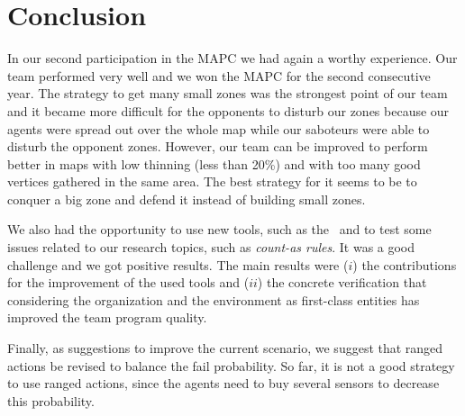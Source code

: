 \section{Conclusion}

In our second participation in the MAPC we had again a worthy experience. Our team performed very well and we won the MAPC for the second consecutive year. The strategy to get many small zones was the strongest point of our team and it became more difficult for the opponents to disturb our zones because our agents were spread out over the whole map while our saboteurs were able to disturb the opponent zones. However, our team can be improved to perform better in maps with low thinning (less than 20\%) and with too many good vertices gathered in the same area. The best strategy for it seems to be to conquer a big zone and defend it instead of building small zones.

We also had the opportunity to use new tools, such as the \jacamo\, and to test some issues related to our research topics, such as \emph{count-as rules}. It was a good challenge and we got positive results. The main results were ($i$) the contributions for the improvement of the used tools and ($ii$) the concrete verification that considering the organization and the environment as first-class entities has improved the team program quality.

Finally, as suggestions to improve the current scenario, we suggest that ranged actions be revised to balance the fail probability. So far, it is not a good strategy to use ranged actions, since the agents need to buy several sensors to decrease this probability.